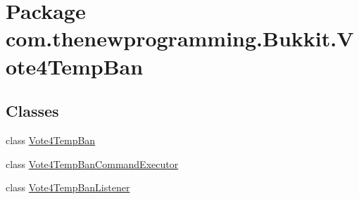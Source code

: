 \hypertarget{namespacecom_1_1thenewprogramming_1_1_bukkit_1_1_vote4_temp_ban}{\section{Package com.\-thenewprogramming.\-Bukkit.\-Vote4\-Temp\-Ban}
\label{namespacecom_1_1thenewprogramming_1_1_bukkit_1_1_vote4_temp_ban}
}
\subsection*{Classes}
\begin{DoxyCompactItemize}
\item 
class \hyperlink{classcom_1_1thenewprogramming_1_1_bukkit_1_1_vote4_temp_ban_1_1_vote4_temp_ban}{Vote4\-Temp\-Ban}
\item 
class \hyperlink{classcom_1_1thenewprogramming_1_1_bukkit_1_1_vote4_temp_ban_1_1_vote4_temp_ban_command_executor}{Vote4\-Temp\-Ban\-Command\-Executor}
\item 
class \hyperlink{classcom_1_1thenewprogramming_1_1_bukkit_1_1_vote4_temp_ban_1_1_vote4_temp_ban_listener}{Vote4\-Temp\-Ban\-Listener}
\end{DoxyCompactItemize}
